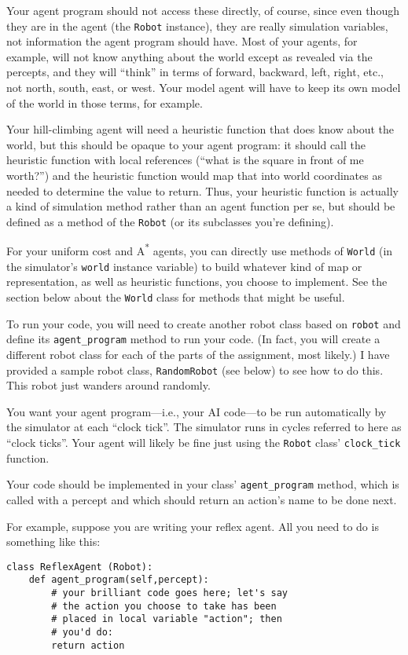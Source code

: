 \documentclass[11pt]{tufte-handout}
\begin{document}
Your agent program should not access these directly, of course, since even though they are in the agent (the \texttt{Robot} instance), they are really simulation variables, not information the agent program should have.  Most of your agents, for example, will not know anything about the world except as revealed via the percepts, and they will ``think'' in terms of forward, backward, left, right, etc., not north, south, east, or west.  Your model agent will have to keep its own model of the world in those terms, for example.  

Your hill-climbing agent will need a heuristic function that does know about the world, but this should be opaque to your agent program: it should call the heuristic function with local references (``what is the square in front of me worth?'') and the heuristic function would map that into world coordinates as needed to determine the value to return.  Thus, your heuristic function is actually a kind of simulation method rather than an agent function per se, but should be defined as a method of the \texttt{Robot} (or its subclasses you're defining).

For your uniform cost and A\textsuperscript{*} agents, you can directly use methods of \texttt{World} (in the simulator's \texttt{world} instance variable) to build whatever kind of map or representation, as well as heuristic functions, you choose to implement.  See the section below about the \texttt{World} class for methods that might be useful.

To run your code, you will need to create another robot class based on \texttt{robot} and define its \texttt{agent\_program} method to run your code.  (In fact, you will create a different robot class for each of the parts of the assignment, most likely.)  I have provided a sample robot class, \texttt{RandomRobot} (see below) to see how to do this.  This robot just wanders around randomly.

You want your agent program---i.e., your AI code---to be run automatically by the simulator at each ``clock tick''.  The simulator runs in cycles referred to here as ``clock ticks''.  Your agent will likely be fine just using the \texttt{Robot} class' \texttt{clock\_tick} function.  

Your code should be implemented in your class' \texttt{agent\_program} method, which is called with a percept and which should return an action's name to be done next.

For example, suppose you are writing your reflex agent.  All you need to do is something like this:
\begin{verbatim}
class ReflexAgent (Robot):
    def agent_program(self,percept):
        # your brilliant code goes here; let's say
        # the action you choose to take has been
        # placed in local variable "action"; then
        # you'd do:
        return action
\end{verbatim}
\end{document}
